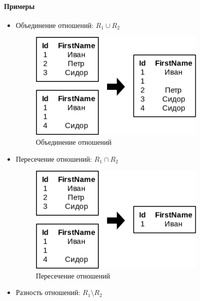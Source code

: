 \paragraph{Примеры}
\begin{itemize}
	\item Объединение отношений: $R_1 \cup R_2$
	      \begin{figure}[H]
		      \centering

		      \includegraphics[width=0.8\textwidth]{../assets/kgeorgiy/relalgebra/Set_Union_2.svg.png}
		      \caption{Объединение отношений}
		      \label{set-union-ex}
	      \end{figure}
	\item Пересечение отношений: $R_1 \cap R_2$
	      \begin{figure}[H]
		      \centering

		      \includegraphics[width=0.8\textwidth]{../assets/kgeorgiy/relalgebra/Set_Intersect_2.svg.png}
		      \caption{Пересечение отношений}
		      \label{set-intersect-ex}
	      \end{figure}
	\item Разность отношений: $R_1 \setminus R_2$
	      \begin{figure}[H]
		      \centering


\end{figure}
\end{itemize}
